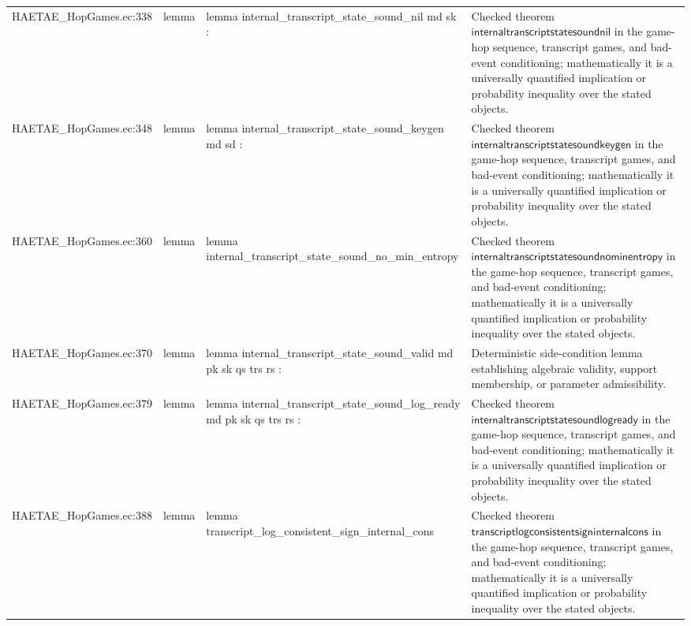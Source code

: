 \documentclass[10pt]{article}
\begin{document}
\begin{longtable}{L{0.11\textwidth}L{0.055\textwidth}L{0.385\textwidth}L{0.41\textwidth}}
HAETAE\_\allowbreak{}HopGames.\allowbreak{}ec:\allowbreak{}338 & lemma & {\ttfamily\scriptsize lemma internal\_\allowbreak{}transcript\_\allowbreak{}state\_\allowbreak{}sound\_\allowbreak{}nil md sk :} & Checked theorem $\mathsf{internaltranscriptstatesoundnil}$ in the game-hop sequence, transcript games, and bad-event conditioning; mathematically it is a universally quantified implication or probability inequality over the stated objects. \\
HAETAE\_\allowbreak{}HopGames.\allowbreak{}ec:\allowbreak{}348 & lemma & {\ttfamily\scriptsize lemma internal\_\allowbreak{}transcript\_\allowbreak{}state\_\allowbreak{}sound\_\allowbreak{}keygen md sd :} & Checked theorem $\mathsf{internaltranscriptstatesoundkeygen}$ in the game-hop sequence, transcript games, and bad-event conditioning; mathematically it is a universally quantified implication or probability inequality over the stated objects. \\
HAETAE\_\allowbreak{}HopGames.\allowbreak{}ec:\allowbreak{}360 & lemma & {\ttfamily\scriptsize lemma internal\_\allowbreak{}transcript\_\allowbreak{}state\_\allowbreak{}sound\_\allowbreak{}no\_\allowbreak{}min\_\allowbreak{}entropy} & Checked theorem $\mathsf{internaltranscriptstatesoundnominentropy}$ in the game-hop sequence, transcript games, and bad-event conditioning; mathematically it is a universally quantified implication or probability inequality over the stated objects. \\
HAETAE\_\allowbreak{}HopGames.\allowbreak{}ec:\allowbreak{}370 & lemma & {\ttfamily\scriptsize lemma internal\_\allowbreak{}transcript\_\allowbreak{}state\_\allowbreak{}sound\_\allowbreak{}valid md pk sk qs trs rs :} & Deterministic side-condition lemma establishing algebraic validity, support membership, or parameter admissibility. \\
HAETAE\_\allowbreak{}HopGames.\allowbreak{}ec:\allowbreak{}379 & lemma & {\ttfamily\scriptsize lemma internal\_\allowbreak{}transcript\_\allowbreak{}state\_\allowbreak{}sound\_\allowbreak{}log\_\allowbreak{}ready md pk sk qs trs rs :} & Checked theorem $\mathsf{internaltranscriptstatesoundlogready}$ in the game-hop sequence, transcript games, and bad-event conditioning; mathematically it is a universally quantified implication or probability inequality over the stated objects. \\
HAETAE\_\allowbreak{}HopGames.\allowbreak{}ec:\allowbreak{}388 & lemma & {\ttfamily\scriptsize lemma transcript\_\allowbreak{}log\_\allowbreak{}consistent\_\allowbreak{}sign\_\allowbreak{}internal\_\allowbreak{}cons} & Checked theorem $\mathsf{transcriptlogconsistentsigninternalcons}$ in the game-hop sequence, transcript games, and bad-event conditioning; mathematically it is a universally quantified implication or probability inequality over the stated objects. \\

\end{longtable}
\end{document}
